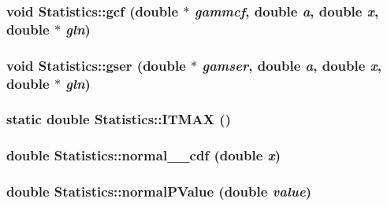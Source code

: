 \hypertarget{classStatistics_a7c05e92e684944e4e24adb04f64dfc74}{
\subsubsection[{gcf}]{\setlength{\rightskip}{0pt plus 5cm}void Statistics::gcf (double $\ast$ {\em gammcf}, \/  double {\em a}, \/  double {\em x}, \/  double $\ast$ {\em gln})}}
\label{classStatistics_a7c05e92e684944e4e24adb04f64dfc74}
\hypertarget{classStatistics_a6f2de659aa389b60e2de44070f1fc467}{
\subsubsection[{gser}]{\setlength{\rightskip}{0pt plus 5cm}void Statistics::gser (double $\ast$ {\em gamser}, \/  double {\em a}, \/  double {\em x}, \/  double $\ast$ {\em gln})}}
\label{classStatistics_a6f2de659aa389b60e2de44070f1fc467}
\hypertarget{classStatistics_af33851046a60580f5c9b75db34f444bf}{
\subsubsection[{ITMAX}]{\setlength{\rightskip}{0pt plus 5cm}static double Statistics::ITMAX ()}}
\label{classStatistics_af33851046a60580f5c9b75db34f444bf}
\hypertarget{classStatistics_a125d2cca3291146c2623f3fcc4a16b43}{
\subsubsection[{normal\_\-01\_\-cdf}]{\setlength{\rightskip}{0pt plus 5cm}double Statistics::normal\_\_\-cdf (double {\em x})}}
\label{classStatistics_a125d2cca3291146c2623f3fcc4a16b43}
\hypertarget{classStatistics_a024e673ac44377b48a9744481d6edc96}{
\subsubsection[{normalPValue}]{\setlength{\rightskip}{0pt plus 5cm}double Statistics::normalPValue (double {\em value})}}
